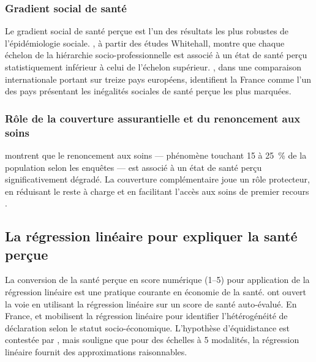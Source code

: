 \documentclass[11pt,a4paper]{memoirerecherche}
\begin{document}
\hypertarget{gradient-social-de-santuxe9}{%
\subsubsection{Gradient social de santé}\label{gradient-social-de-santuxe9}}

Le gradient social de santé perçue est l'un des résultats les plus robustes de l'épidémiologie sociale. \textcite{marmot2005}, à partir des études Whitehall, montre que chaque échelon de la hiérarchie socio-professionnelle est associé à un état de santé perçu statistiquement inférieur à celui de l'échelon supérieur. \textcite{van_doorslaer2004}, dans une comparaison internationale portant sur treize pays européens, identifient la France comme l'un des pays présentant les inégalités sociales de santé perçue les plus marquées.

\hypertarget{ruxf4le-de-la-couverture-assurantielle-et-du-renoncement-aux-soins}{%
\subsubsection{Rôle de la couverture assurantielle et du renoncement aux soins}\label{ruxf4le-de-la-couverture-assurantielle-et-du-renoncement-aux-soins}}

\textcite{despres2011} montrent que le renoncement aux soins --- phénomène touchant 15 à 25~\% de la population selon les enquêtes --- est associé à un état de santé perçu significativement dégradé. La couverture complémentaire joue un rôle protecteur, en réduisant le reste à charge et en facilitant l'accès aux soins de premier recours \autocite{dourgnon2012}.

\hypertarget{la-ruxe9gression-linuxe9aire-pour-expliquer-la-santuxe9-peruxe7ue}{%
\subsection{La régression linéaire pour expliquer la santé perçue}\label{la-ruxe9gression-linuxe9aire-pour-expliquer-la-santuxe9-peruxe7ue}}

La conversion de la santé perçue en score numérique (1--5) pour application de la régression linéaire est une pratique courante en économie de la santé. \textcite{kennedy1998} ont ouvert la voie en utilisant la régression linéaire sur un score de santé auto-évalué. En France, \textcite{devaux2010} et \textcite{etile2007} mobilisent la régression linéaire pour identifier l'hétérogénéité de déclaration selon le statut socio-économique. L'hypothèse d'équidistance est contestée par \textcite{boes2006}, mais \textcite{greene2018} souligne que pour des échelles à 5 modalités, la régression linéaire fournit des approximations raisonnables.
\end{document}
